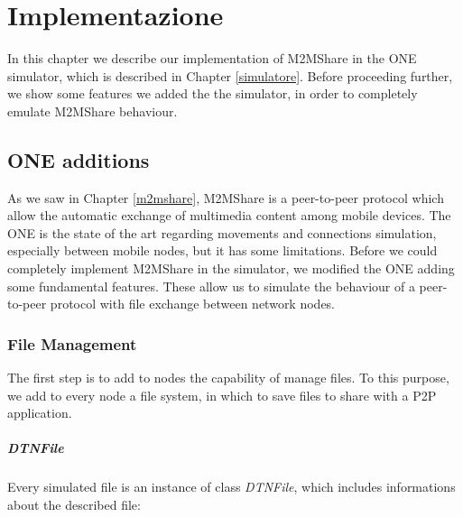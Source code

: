 
\chapter{Implementazione}\label{implementazione} %



\graphicspath{{6-implementazione/img/}}


In this chapter we describe our implementation of M2MShare in the ONE simulator, which is described in Chapter \ref{simulatore}. Before proceeding further, we show some features we added the the simulator, in order to completely emulate M2MShare behaviour.
  

\section{ONE additions}
As we saw in Chapter \ref{m2mshare}, M2MShare is a peer-to-peer protocol which allow the automatic exchange of multimedia content among mobile devices. The ONE is the state of the art regarding movements and connections simulation, especially between mobile nodes, but it has some limitations. Before we could completely implement M2MShare in the simulator, we modified the ONE adding some fundamental features. These allow us to simulate the behaviour of a peer-to-peer protocol with file exchange between network nodes.


\subsection{File Management}
The first step is to add to nodes the capability of manage files. To this purpose, we add to every node a file system, in which to save files to share with a P2P application. 


\paragraph{DTNFile}
Every simulated file is an instance of class \textit{DTNFile}, which includes informations about the described file:

